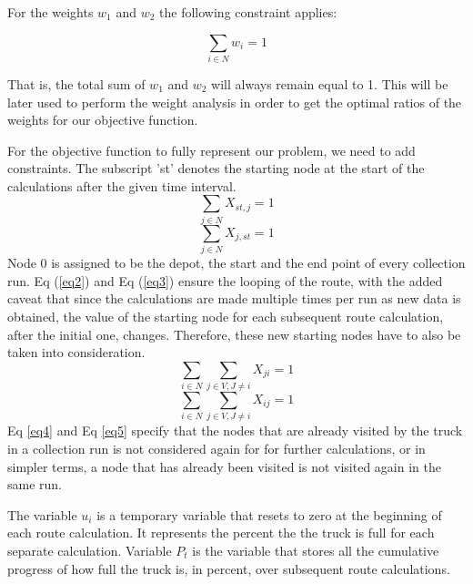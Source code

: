 \documentclass[12pt]{article}
\begin{document}
For the weights $w_1$ and $w_2$ the following constraint applies:

\begin{equation}\label{eq1.5}
    \sum_{i\in N} w_i = 1
\end{equation}

That is, the total sum of $w_1$ and $w_2$ will always remain equal to 1. This will be later used to perform the weight analysis in order to get the optimal ratios of the weights for our objective function.

For the objective function to fully represent our problem, we need to add constraints. The subscript 'st' denotes the starting node at the start of the calculations after the given time interval.
\begin{equation}\label{eq2}
    \sum_{j\in N}X_{st,j}=1
\end{equation}
\begin{equation}\label{eq3}
    \sum_{j\in N}X_{j,st}=1
\end{equation}
Node 0 is assigned to be the depot, the start and the end point of every collection run. Eq (\ref{eq2}) and Eq (\ref{eq3}) ensure the looping of the route, with the added caveat that since the calculations are made multiple times per run as new data is obtained, the value of the starting node for each subsequent route calculation, after the initial one, changes. Therefore, these new starting nodes have to also be taken into consideration.
\begin{equation}\label{eq4}
    \sum_{i\in N}\sum_{j\in V, J\ne i} X_{ji}=1
\end{equation}
\begin{equation}\label{eq5}
    \sum_{i\in N}\sum_{j\in V, J\ne i} X_{ij}=1
\end{equation}
Eq \eqref{eq4} and Eq \eqref{eq5} specify that the nodes that are already visited by the truck in a collection run is not considered again for for further calculations, or in simpler terms, a node that has already been visited is not visited again in the same run.

The variable $u_i$ is a temporary variable that resets to zero at the beginning of each route calculation. It represents the percent the the truck is full for each separate calculation. Variable $P_t$ is the variable that stores all the cumulative progress of how full the truck is, in percent, over subsequent route calculations.
\end{document}
